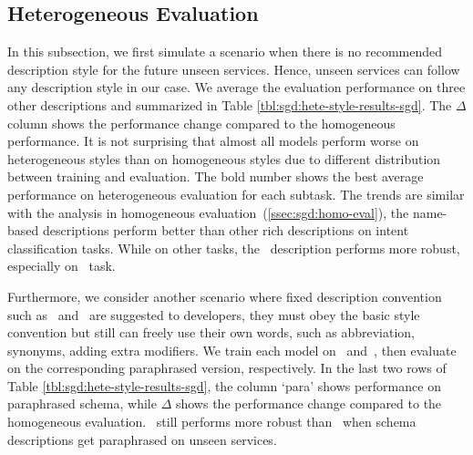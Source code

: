 \subsection{Heterogeneous Evaluation}
\label{ssec:sgd:heter-eval}
In this subsection, we first simulate a scenario when there is no
recommended description style for the future unseen services. Hence,
unseen services can follow any description style in our case. We
average the evaluation performance on three other descriptions and
summarized in Table \ref{tbl:sgd:hete-style-results-sgd}. The $\Delta$ column
shows the performance change compared to the homogeneous
performance. It is not surprising that almost all models perform worse
on heterogeneous styles than on homogeneous styles due to different
distribution between training and evaluation. The bold number shows
the best average performance on heterogeneous evaluation for each
subtask. The trends are similar with the analysis in homogeneous
evaluation~(\autoref{ssec:sgd:homo-eval}), the name-based descriptions perform
better than other rich descriptions on intent classification
tasks. While on other tasks, the \ORIGIN~description performs more
robust, especially on \NSL~task.

Furthermore, we consider another scenario where fixed description
convention such as \NAMEONLY~and \ORIGIN~are suggested to developers,
they must obey the basic style convention but still can freely use
their own words, such as abbreviation, synonyms, adding extra
modifiers. We train each model on \NAMEONLY~and~\ORIGIN, then evaluate
on the corresponding paraphrased version, respectively. In the last two
rows of Table \ref{tbl:sgd:hete-style-results-sgd}, the column `para'
shows performance on paraphrased schema, while $\Delta$ shows the
performance change compared to the homogeneous evaluation.
\ORIGIN~still performs more robust than \NAMEONLY~when schema
descriptions get paraphrased on unseen services.


